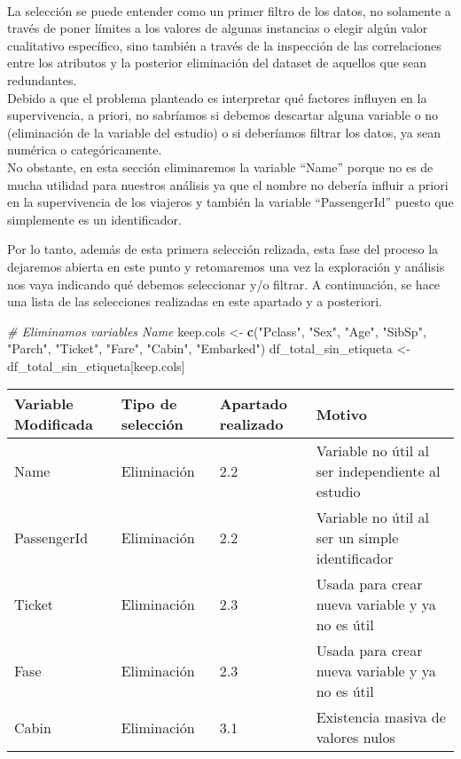 \documentclass[
]{article}
\newenvironment{Shaded}{\begin{snugshade}}{\end{snugshade}}
\newcommand{\CommentTok}[1]{\textcolor[rgb]{0.56,0.35,0.01}{\textit{#1}}}
\newcommand{\KeywordTok}[1]{\textcolor[rgb]{0.13,0.29,0.53}{\textbf{#1}}}
\newcommand{\NormalTok}[1]{#1}
\newcommand{\StringTok}[1]{\textcolor[rgb]{0.31,0.60,0.02}{#1}}
\begin{document}
\texttt{}\\
La selección se puede entender como un primer filtro de los datos, no
solamente a través de poner límites a los valores de algunas instancias
o elegir algún valor cualitativo específico, sino también a través de la
inspección de las correlaciones entre los atributos y la posterior
eliminación del dataset de aquellos que sean redundantes. \texttt{}\\
Debido a que el problema planteado es interpretar qué factores influyen
en la supervivencia, a priori, no sabríamos si debemos descartar alguna
variable o no (eliminación de la variable del estudio) o si deberíamos
filtrar los datos, ya sean numérica o categóricamente. \texttt{}\\
No obstante, en esta sección eliminaremos la variable ``Name'' porque no
es de mucha utilidad para nuestros análisis ya que el nombre no debería
influir a priori en la supervivencia de los viajeros y también la
variable ``PassengerId'' puesto que simplemente es un identificador.
\texttt{}

Por lo tanto, además de esta primera selección relizada, esta fase del
proceso la dejaremos abierta en este punto y retomaremos una vez la
exploración y análisis nos vaya indicando qué debemos seleccionar y/o
filtrar. A continuación, se hace una lista de las selecciones realizadas
en este apartado y a posteriori. \texttt{}

\begin{Shaded}
\begin{Highlighting}[]
\CommentTok{# Eliminamos variables Name}
\NormalTok{keep.cols <-}\StringTok{ }\KeywordTok{c}\NormalTok{(}\StringTok{"Pclass"}\NormalTok{, }\StringTok{"Sex"}\NormalTok{, }\StringTok{"Age"}\NormalTok{, }\StringTok{"SibSp"}\NormalTok{, }\StringTok{"Parch"}\NormalTok{, }\StringTok{"Ticket"}\NormalTok{, }\StringTok{"Fare"}\NormalTok{, }\StringTok{"Cabin"}\NormalTok{, }\StringTok{"Embarked"}\NormalTok{)}
\NormalTok{df_total_sin_etiqueta <-}\StringTok{ }\NormalTok{df_total_sin_etiqueta[keep.cols]}
\end{Highlighting}
\end{Shaded}

\texttt{}

\begin{longtable}[]{@{}llll@{}}
\toprule
Variable Modificada & Tipo de selección & Apartado realizado &
Motivo\tabularnewline
\midrule
\endhead
Name & Eliminación & 2.2 & Variable no útil al ser independiente al
estudio\tabularnewline
PassengerId & Eliminación & 2.2 & Variable no útil al ser un simple
identificador\tabularnewline
Ticket & Eliminación & 2.3 & Usada para crear nueva variable y ya no es
útil\tabularnewline
Fase & Eliminación & 2.3 & Usada para crear nueva variable y ya no es
útil\tabularnewline
Cabin & Eliminación & 3.1 & Existencia masiva de valores
nulos\tabularnewline
\bottomrule
\end{longtable}
\end{document}

